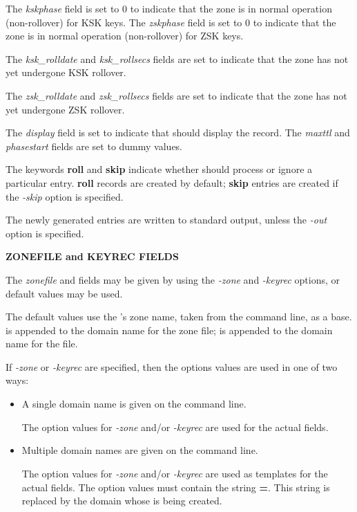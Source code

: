 The {\it kskphase} field is set to 0 to indicate that the zone is in normal
operation (non-rollover) for KSK keys.  The {\it zskphase} field is set to 0
to indicate that the zone is in normal operation (non-rollover) for ZSK keys.

The {\it ksk\_rolldate} and {\it ksk\_rollsecs} fields are set to indicate
that the zone has not yet undergone KSK rollover.

The {\it zsk\_rolldate} and {\it zsk\_rollsecs} fields are set to indicate
that the zone has not yet undergone ZSK rollover.

The {\it display} field is set to indicate that  should
display the record.  The {\it maxttl} and {\it phasestart} fields are set to
dummy values.

The keywords {\bf roll} and {\bf skip} indicate whether  should
process or ignore a particular  entry.  {\bf roll} records are
created by default; {\bf skip} entries are created if the {\it -skip} option
is specified.

The newly generated  entries are written to standard output,
unless the {\it -out} option is specified.

{\bf ZONEFILE and KEYREC FIELDS}

The {\it zonefile} and  fields may be given by using the {\it
-zone} and {\it -keyrec} options, or default values may be used.

The default values use the 's zone name, taken from the
command line, as a base.   is appended to the domain name
for the zone file;  is appended to the domain name for the
 file.

If {\it -zone} or {\it -keyrec} are specified, then the options values are
used in one of two ways:

\begin{itemize}

\item A single domain name is given on the command line.\verb" "

The option values for {\it -zone} and/or {\it -keyrec} are used for the actual
 fields.

\item Multiple domain names are given on the command line.\verb" "

The option values for {\it -zone} and/or {\it -keyrec} are used as templates
for the actual  fields.  The option values must contain the
string {\bf =}.  This string is replaced by the domain whose 
is being created.

\end{itemize}

